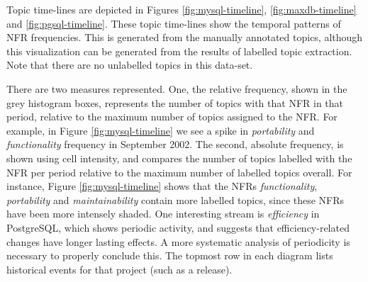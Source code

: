 \documentclass[smallextended]{svjour3}       %
\begin{document}
Topic time-lines are depicted in Figures \ref{fig:mysql-timeline}, 
\ref{fig:maxdb-timeline} and \ref{fig:pgsql-timeline}. These topic time-lines show the
temporal patterns of NFR frequencies.
This is generated from the manually annotated
topics, although this visualization can be generated from the
results of labelled topic extraction. Note that there are no unlabelled topics in this data-set.

There are two measures represented. 
One, the relative frequency, shown in the grey histogram boxes, represents the number of topics with that NFR in that period, 
relative to the maximum number of topics assigned to the NFR. 
For example, in Figure \ref{fig:mysql-timeline} we see a spike in \emph{portability} and \emph{functionality} frequency in September 2002.
The second, absolute frequency, is shown using cell intensity, and compares the number of topics labelled with the NFR per period 
relative to the maximum number of labelled topics overall. 
For instance, Figure \ref{fig:mysql-timeline} shows that the NFRs
\emph{functionality}, \emph{portability} and \emph{maintainability}
contain more labelled topics, since these NFRs have been more
intensely shaded. One interesting stream is \emph{efficiency} in PostgreSQL, which shows periodic
activity, and suggests that efficiency-related changes
have longer lasting effects. A more systematic analysis of periodicity is necessary to properly conclude this.
The topmost row in each diagram lists historical events for that project (such as a release). 
\end{document}
